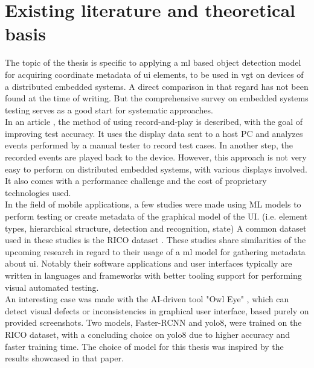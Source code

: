 \documentclass[Bachelor, BIC, english, fhCitStyle, IEEE]{BASE/twbook} %
\begin{document}
\chapter{Existing literature and theoretical basis}
The topic of the thesis is specific to applying a \ac{ml} based object detection model for acquiring coordinate metadata of \ac{ui} elements, to be used in \ac{vgt} on devices of a distributed embedded systems. A direct comparison in that regard has not been found at the time of writing. But the comprehensive survey \autocite{garousiTestingEmbeddedSoftware2018} on embedded systems testing serves as a good start for systematic approaches.\\
In an article \autocite{linImprovingAccuracyAutomated2014}, the method of using record-and-play is described, with the goal of improving test accuracy. It uses the display data sent to a host PC and analyzes events performed by a manual tester to record test cases. In another step, the recorded events are played back to the device. However, this approach is not very easy to perform on distributed embedded systems, with various displays involved. It also comes with a performance challenge and the cost of proprietary technologies used.\\
In the field of mobile applications, a few studies were made using ML models to perform testing or create metadata of the graphical model of the UI. (i.e. element types, hierarchical structure, detection and recognition, state) \autocite{altinbasGUIElementDetection2022,chengMobileApplicationGUI2021,liWidgetCaptioningGenerating2020,selcukComparisonYOLOv5YOLOv82023,zhangDeepLearningBasedMobile2020,zhangMachineVisionbasedTesting2022, cavsakCavsakGUIComponent} A common dataset used in these studies is the RICO dataset \autocite{dekaRicoMobileApp2017}.
These studies share similarities of the upcoming research in regard to their usage of a \ac{ml} model for gathering metadata about \ac{ui}. Notably their software applications and user interfaces typically are written in languages and frameworks with better tooling support for performing visual automated testing.\\
An interesting case was made with the AI-driven tool "Owl Eye" \autocite{gamalOwlEyeAIDriven2023}, which can detect visual defects or inconsistencies in graphical user interface, based purely on provided screenshots. Two models, Faster-RCNN and \ac{yolo8}, were trained on the RICO dataset, with a concluding choice on \ac{yolo8} due to higher accuracy and faster training time. The choice of model for this thesis was inspired by the results showcased in that paper.\\
\end{document}
